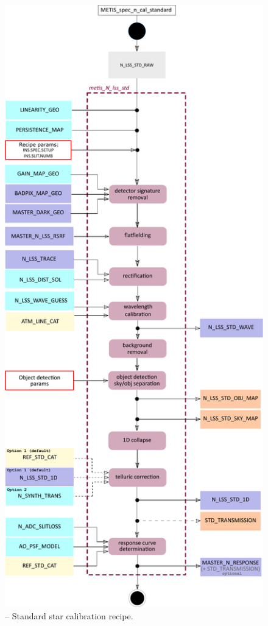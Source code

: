 \begin{figure}[ht]
  \centering
  \includegraphics[width=0.4\textheight]{figures/metis_n_lss_std_v0.83.pdf}
  \caption[Recipe: ]{ --
    Standard star calibration recipe.}
  \label{Fig:rec_N_lss_flux}
\end{figure}
